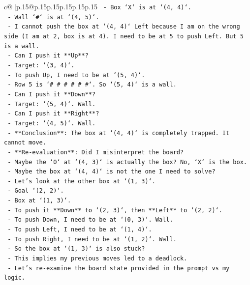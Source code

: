 \documentclass{article}
\begin{document}
{\begin{supertabular}{c@{$\;$}|p{.15\linewidth}@{}p{.15\linewidth}p{.15\linewidth}p{.15\linewidth}p{.15\linewidth}p{.15\linewidth}}
{{{\texttt{      {-} Box `X` is at `(4, 4)`.} \\
\texttt{      {-} Wall `\#` is at `(4, 5)`.} \\
\texttt{    {-} I cannot push the box at `(4, 4)` Left because I am on the wrong side (I am at 2, box is at 4). I need to be at 5 to push Left. But 5 is a wall.} \\
\texttt{    {-} Can I push it **Up**?} \\
\texttt{      {-} Target: `(3, 4)`.} \\
\texttt{      {-} To push Up, I need to be at `(5, 4)`.} \\
\texttt{      {-} Row 5 is `\# \# \# \# \# \#`. So `(5, 4)` is a wall.} \\
\texttt{    {-} Can I push it **Down**?} \\
\texttt{      {-} Target: `(5, 4)`. Wall.} \\
\texttt{    {-} Can I push it **Right**?} \\
\texttt{      {-} Target: `(4, 5)`. Wall.} \\
\texttt{    {-} **Conclusion**: The box at `(4, 4)` is completely trapped. It cannot move.} \\
\texttt{    {-} **Re{-}evaluation**: Did I misinterpret the board?} \\
\texttt{      {-} Maybe the `O` at `(4, 3)` is actually the box? No, `X` is the box.} \\
\texttt{      {-} Maybe the box at `(4, 4)` is not the one I need to solve?} \\
\texttt{      {-} Let's look at the other box at `(1, 3)`.} \\
\texttt{      {-} Goal `(2, 2)`.} \\
\texttt{      {-} Box at `(1, 3)`.} \\
\texttt{      {-} To push it **Down** to `(2, 3)`, then **Left** to `(2, 2)`.} \\
\texttt{      {-} To push Down, I need to be at `(0, 3)`. Wall.} \\
\texttt{      {-} To push Left, I need to be at `(1, 4)`.} \\
\texttt{      {-} To push Right, I need to be at `(1, 2)`. Wall.} \\
\texttt{      {-} So the box at `(1, 3)` is also stuck?} \\
\texttt{      {-} This implies my previous moves led to a deadlock.} \\
\texttt{      {-} Let's re{-}examine the board state provided in the prompt vs my logic.} \\
}}}
\end{supertabular}}
\end{document}
